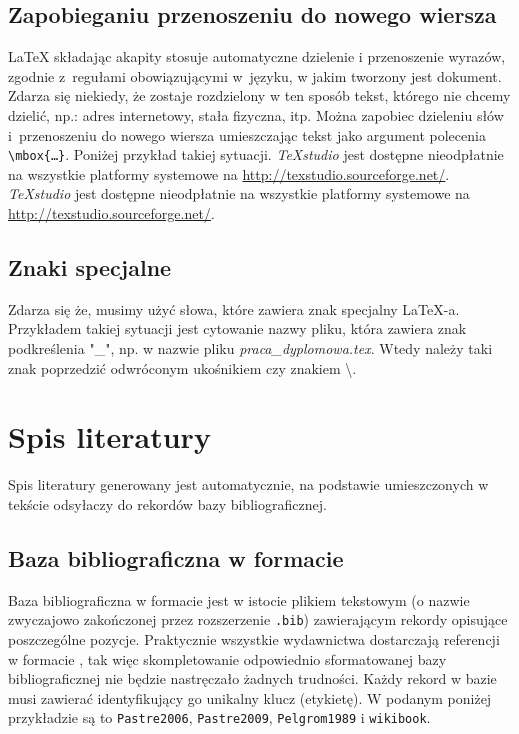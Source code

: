 \subsection{Zapobieganiu przenoszeniu do nowego wiersza}
{\LaTeX} składając akapity stosuje automatyczne dzielenie i przenoszenie wyrazów, zgodnie z~regułami obowiązującymi w~języku, w jakim tworzony jest dokument. Zdarza się niekiedy, że zostaje rozdzielony   w ten sposób tekst, którego nie chcemy dzielić, np.: adres internetowy, stała fizyczna, itp. Można zapobiec dzieleniu słów i~przenoszeniu do nowego wiersza umieszczając tekst jako argument polecenia  \texttt{\textbackslash mbox\{\dots \}}. Poniżej przykład takiej sytuacji.
\vskip12pt
\textit{TeXstudio} jest dostępne nieodpłatnie na wszystkie platformy systemowe  na \url{http://texstudio.sourceforge.net/}.
\vskip12pt
\textit{TeXstudio} jest dostępne nieodpłatnie na wszystkie platformy systemowe  na \mbox{\url{http://texstudio.sourceforge.net/}}.

\subsection{Znaki specjalne}
Zdarza się że, musimy użyć słowa, które zawiera znak specjalny {\LaTeX}-a. Przykładem takiej sytuacji jest cytowanie nazwy pliku, która zawiera znak podkreślenia  "\_", np. w nazwie pliku \textit{praca\_dyplomowa.tex}. Wtedy należy taki znak poprzedzić odwróconym ukośnikiem czy znakiem \textbackslash.

\newpage
\section{Spis literatury}
Spis literatury generowany jest automatycznie, na podstawie umieszczonych w tekście odsyłaczy do rekordów bazy bibliograficznej.  
\subsection{Baza bibliograficzna w formacie \BibTeX}
Baza bibliograficzna w formacie \BibTeX jest w istocie plikiem tekstowym (o nazwie zwyczajowo zakończonej przez rozszerzenie \texttt{.bib}) zawierającym rekordy opisujące poszczególne pozycje. Praktycznie wszystkie wydawnictwa dostarczają referencji w formacie  \BibTeX, tak więc skompletowanie odpowiednio sformatowanej bazy bibliograficznej nie będzie nastręczało żadnych trudności. Każdy rekord w bazie musi zawierać  identyfikujący go unikalny klucz (etykietę). W podanym poniżej przykładzie są to \texttt{Pastre2006}, \texttt{Pastre2009}, \texttt{Pelgrom1989} i \texttt{wikibook}. 

